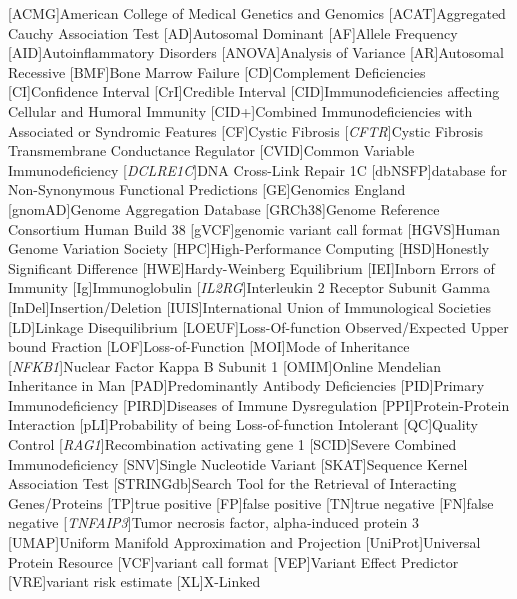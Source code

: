 \begin{acronym}
[ACMG]{American College of Medical Genetics and Genomics}%
[ACAT]{Aggregated Cauchy Association Test}%
[AD]{Autosomal Dominant}%
  [AF]{Allele Frequency}
 [AID]{Autoinflammatory Disorders}
 [ANOVA]{Analysis of Variance}
 [AR]{Autosomal Recessive}
 [BMF]{Bone Marrow Failure}
 [CD]{Complement Deficiencies}
 [CI]{Confidence Interval}
 [CrI]{Credible Interval}
 [CID]{Immunodeficiencies affecting Cellular and Humoral Immunity}
 [CID+]{Combined Immunodeficiencies with Associated or Syndromic Features}
 [CF]{Cystic Fibrosis}
 [\textit{CFTR}]{Cystic Fibrosis Transmembrane Conductance Regulator}
 [CVID]{Common Variable Immunodeficiency}
  [\textit{DCLRE1C}]{DNA Cross-Link Repair 1C}
 [dbNSFP]{database for Non-Synonymous Functional Predictions}
 [GE]{Genomics England} 
 [gnomAD]{Genome Aggregation Database}
 [GRCh38]{Genome Reference Consortium Human Build 38}
[gVCF]{genomic variant call format}
 [HGVS]{Human Genome Variation Society}
 [HPC]{High-Performance Computing}
 [HSD]{Honestly Significant Difference}
 [HWE]{Hardy-Weinberg Equilibrium}
 [IEI]{Inborn Errors of Immunity}
  [Ig]{Immunoglobulin}
 [\textit{IL2RG}]{Interleukin 2 Receptor Subunit Gamma}
 [InDel]{Insertion/Deletion}
 [IUIS]{International Union of Immunological Societies}
 [LD]{Linkage Disequilibrium}
 [LOEUF]{Loss-Of-function Observed/Expected Upper bound Fraction}
 [LOF]{Loss-of-Function}
 [MOI]{Mode of Inheritance}
 [\textit{NFKB1}]{Nuclear Factor Kappa B Subunit 1}
 [OMIM]{Online Mendelian Inheritance in Man}
 [PAD]{Predominantly Antibody Deficiencies}
 [PID]{Primary Immunodeficiency}
 [PIRD]{Diseases of Immune Dysregulation}
 [PPI]{Protein-Protein Interaction}
 [pLI]{Probability of being Loss-of-function Intolerant}
 [QC]{Quality Control}
 [\textit{RAG1}]{Recombination activating gene 1}
 [SCID]{Severe Combined Immunodeficiency}
 [SNV]{Single Nucleotide Variant}
 [SKAT]{Sequence Kernel Association Test}
 [STRINGdb]{Search Tool for the Retrieval of Interacting Genes/Proteins}
 [TP]{true positive}
[FP]{false positive}
[TN]{true negative}
[FN]{false negative}
[\textit{TNFAIP3}]{Tumor necrosis factor, alpha-induced protein 3}
 [UMAP]{Uniform Manifold Approximation and Projection}
 [UniProt]{Universal Protein Resource} 
 [VCF]{variant call format}
 [VEP]{Variant Effect Predictor}
 [VRE]{variant risk estimate}
 [XL]{X-Linked}
\end{acronym}

